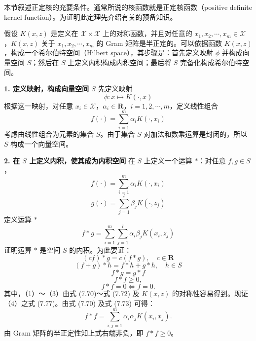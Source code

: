 \documentclass[UTF8, 12pt, fontset=fandol, oneside]{ctexart}
\begin{document}
本节叙述正定核的充要条件。通常所说的核函数就是正定核函数（positive definite kernel function）。为证明此定理先介绍有关的预备知识。

假设 $K(x,z)$ 是定义在 $\mathcal{X}\times\mathcal{X}$ 上的对称函数，并且对任意的 $x_1,x_2,\cdots,x_m\in\mathcal{X}$，$K(x,z)$ 关于 $x_1,x_2,\cdots,x_m$ 的 Gram 矩阵是半正定的。可以依据函数 $K(x,z)$，构成一个希尔伯特空间（Hilbert space），其步骤是：首先定义映射 $\phi$ 并构成向量空间 $S$；然后在 $S$ 上定义内积构成内积空间；最后将 $S$ 完备化构成希尔伯特空间。

\noindent\textbf{1. 定义映射，构成向量空间 $S$}\quad
先定义映射
\begin{equation}
\phi:x\mapsto K(\cdot,x)
\tag{7.69}
\end{equation}
根据这一映射，对任意 $x_i\in\mathcal{X}$，$\alpha_i\in\mathbf{R}$，$i=1,2,\cdots,m$，定义线性组合
\begin{equation}
f(\cdot)=\sum_{i=1}^m\alpha_iK(\cdot,x_i)
\tag{7.70}
\end{equation}
考虑由线性组合为元素的集合 $S$。由于集合 $S$ 对加法和数乘运算是封闭的，所以 $S$ 构成一个向量空间。

\noindent\textbf{2. 在 $S$ 上定义内积，使其成为内积空间}\quad
在 $S$ 上定义一个运算 $*$：对任意 $f,g\in S$，
\begin{equation}
f(\cdot)=\sum_{i=1}^m\alpha_iK(\cdot,x_i)
\tag{7.71}
\end{equation}
\begin{equation}
g(\cdot)=\sum_{j=1}^l\beta_jK(\cdot,z_j)
\tag{7.72}
\end{equation}
定义运算 $*$
\begin{equation}
f*g=\sum_{i=1}^m\sum_{j=1}^l\alpha_i\beta_jK(x_i,z_j)
\tag{7.73}
\end{equation}
证明运算 $*$ 是空间 $S$ 的内积。为此要证：
\begin{equation}
(cf)*g=c(f*g),\quad c\in\mathbf{R}
\tag{7.74}
\end{equation}
\begin{equation}
(f+g)*h=f*h+g*h,\quad h\in S
\tag{7.75}
\end{equation}
\begin{equation}
f*g=g*f
\tag{7.76}
\end{equation}
\begin{equation}
f*f\geq 0,
\tag{7.77}
\end{equation}
\begin{equation}
f*f=0\Leftrightarrow f=0.
\tag{7.78}
\end{equation}
其中，（1）～（3）由式 (7.70)～式 (7.72) 及 $K(x,z)$ 的对称性容易得到。现证（4）之式 (7.77)。由式 (7.70) 及式 (7.73) 可得：
\[
f*f=\sum_{i,j=1}^m\alpha_i\alpha_jK(x_i,x_j).
\]
由 Gram 矩阵的半正定性知上式右端非负，即 $f*f\geq 0$。
\end{document}
